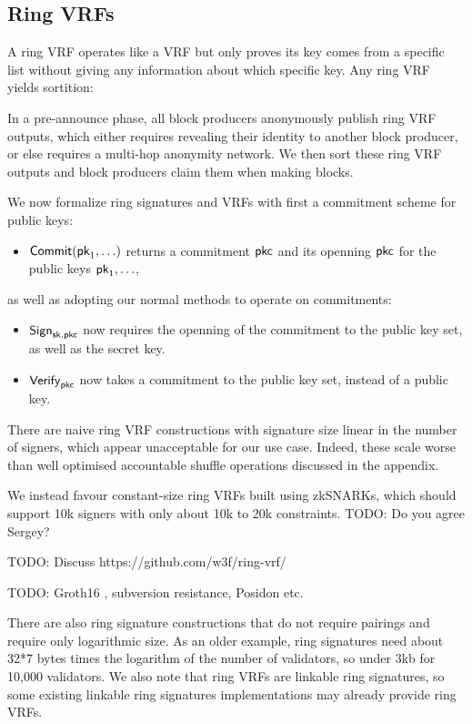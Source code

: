 \subsection{Ring VRFs}

A ring VRF operates like a VRF but only proves its key comes from a specific list without giving any information about which specific key.  Any ring VRF yields sortition:

In a pre-announce phase, all block producers anonymously publish ring VRF outputs, which either requires revealing their identity to another block producer, or else requires a multi-hop anonymity network.  We then sort these ring VRF outputs and block producers claim them when making blocks.

We now formalize ring signatures and VRFs with first a commitment scheme for public keys:
\begin{itemize}
\item $\mathsf{Commit}(\mathsf{pk}_1,\ldots)$ returns a commitment $\mathsf{pkc}$ and its openning $\mathsf{pkc}$ for the public keys $\mathsf{pk}_1,\ldots$,
\end{itemize}
as well as adopting our normal methods to operate on commitments:
\begin{itemize}
\item $\mathsf{Sign}_{\mathsf{sk},\mathsf{pkc}}$ now requires the openning of the commitment to the public key set, as well as the secret key.
\item $\mathsf{Verify}_{\mathsf{pkc}}$ now takes a commitment to the public key set, instead of a public key.
\end{itemize}

There are naive ring VRF constructions with signature size linear in the number of signers, which appear unacceptable for our use case.  Indeed, these scale worse than well optimised accountable shuffle operations discussed in the appendix.


We instead favour constant-size ring VRFs built using zkSNARKs, which should support 10k signers with only about 10k to 20k constraints.  TODO: Do you agree Sergey?

TODO:  Discuss https://github.com/w3f/ring-vrf/

TODO:  Groth16 \cite{Groth16}, subversion resistance, Posidon etc.

There are also ring signature constructions that do not require pairings and require only logarithmic size.  As an older example, ring signatures \cite{GK2015} need about 32*7 bytes times the logarithm of the number of validators, so under 3kb for 10,000 validators.  We also note that ring VRFs are linkable ring signatures, so some existing linkable ring signatures implementations may already provide ring VRFs.

